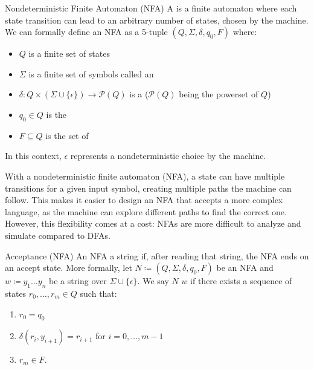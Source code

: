 \documentclass[12pt]{report}
\begin{document}
\begin{dfnbox}{Nondeterministic Finite Automaton (NFA)}{}
    A  is a finite automaton where each state transition can lead to an arbitrary number of states, chosen by the machine.
    \tcblower
    We can formally define an NFA as a 5-tuple $(Q, \Sigma, \delta, q_0, F)$ where:
    \begin{itemize}[noitemsep]
        \item $Q$ is a finite set of states
        \item $\Sigma$ is a finite set of symbols called an 
        \item $\delta : Q \times (\Sigma \cup \{ \epsilon\}) \to \mathcal{P}(Q)$ is a  ($\mathcal{P}(Q)$ being the powerset of $Q$)
        \item $q_0 \in Q$ is the 
        \item $F \subseteq Q$ is the set of 
    \end{itemize}
    In this context, $\epsilon$ represents a nondeterministic choice by the machine.
\end{dfnbox}

With a nondeterministic finite automaton (NFA), a state can have multiple transitions for a given input symbol, creating multiple paths the machine can follow. This makes it easier to design an NFA that accepts a more complex language, as the machine can explore different paths to find the correct one. However, this flexibility comes at a cost: NFAs are more difficult to analyze and simulate compared to DFAs.

\begin{dfnbox}{Acceptance (NFA)}{}
    An NFA  a string if, after reading that string, the NFA ends on an accept state.
    \tcblower
    More formally, let $N \coloneq (Q, \Sigma, \delta, q_0, F)$ be an NFA and $w \coloneq y_1 \ldots y_n$ be a string over $\Sigma \cup \{\epsilon\}$. We say $N$  $w$ if there exists a sequence of states $r_0, \ldots, r_m \in Q$ such that:
    \begin{enumerate}[noitemsep]
        \item $r_0 = q_0$
        \item $\delta(r_i, y_{i+1}) = r_{i+1}$ for $i = 0, \ldots, m-1$
        \item $r_m \in F$.
    \end{enumerate}
\end{dfnbox}
\end{document}
